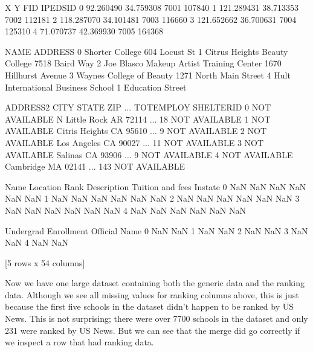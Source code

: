 \documentclass[letterpaper,10pt,english]{jupyterBook}
\begin{document}
\begin{sphinxVerbatim}[commandchars=\\\{\}]
            X          Y   FID  IPEDSID  \PYGZbs{}
0  \PYGZhy{}92.260490  34.759308  7001   107840   
1 \PYGZhy{}121.289431  38.713353  7002   112181   
2 \PYGZhy{}118.287070  34.101481  7003   116660   
3 \PYGZhy{}121.652662  36.700631  7004   125310   
4  \PYGZhy{}71.070737  42.369930  7005   164368   

                                       NAME                 ADDRESS  \PYGZbs{}
0                           Shorter College           604 Locust St   
1             Citrus Heights Beauty College          7518 Baird Way   
2  Joe Blasco Makeup Artist Training Center   1670 Hillhurst Avenue   
3                  Waynes College of Beauty  1271 North Main Street   
4        Hult International Business School      1 Education Street   

        ADDRESS2            CITY STATE    ZIP  ... TOT\PYGZus{}EMPLOY     SHELTER\PYGZus{}ID  \PYGZbs{}
0  NOT AVAILABLE   N Little Rock    AR  72114  ...         18  NOT AVAILABLE   
1  NOT AVAILABLE  Citris Heights    CA  95610  ...          9  NOT AVAILABLE   
2  NOT AVAILABLE     Los Angeles    CA  90027  ...         11  NOT AVAILABLE   
3  NOT AVAILABLE         Salinas    CA  93906  ...          9  NOT AVAILABLE   
4  NOT AVAILABLE       Cambridge    MA  02141  ...        143  NOT AVAILABLE   

   Name Location  Rank Description  Tuition and fees In\PYGZhy{}state  \PYGZbs{}
0   NaN      NaN   NaN         NaN               NaN      NaN   
1   NaN      NaN   NaN         NaN               NaN      NaN   
2   NaN      NaN   NaN         NaN               NaN      NaN   
3   NaN      NaN   NaN         NaN               NaN      NaN   
4   NaN      NaN   NaN         NaN               NaN      NaN   

   Undergrad Enrollment  Official Name  
0                   NaN            NaN  
1                   NaN            NaN  
2                   NaN            NaN  
3                   NaN            NaN  
4                   NaN            NaN  

[5 rows x 54 columns]
\end{sphinxVerbatim}

\sphinxAtStartPar
Now we have one large dataset containing both the generic data and the ranking data.  Although we see all missing values for ranking columns above, this is just because the first five schools in the dataset didn’t happen to be ranked by US News.  This is not surprising; there were over 7700 schools in the dataset and only 231 were ranked by US News.  But we can see that the merge did go correctly if we inspect a row that had ranking data.
\end{document}
